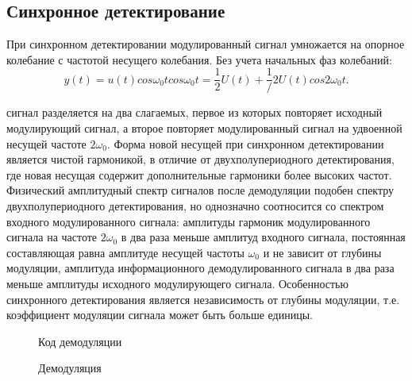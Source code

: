 \documentclass[12pt,a4paper]{scrartcl}
\begin{document}
\clearpage
\newpage

\subsection{Синхронное детектирование}
\label{sec:syn_demod}

При синхронном детектировании модулированный сигнал умножается на опорное колебание с частотой несущего колебания. Без учета начальных фаз колебаний: $$y(t)=u(t)cos \omega_0 t cos \omega_0 t = \frac{1}{2}U(t)+\frac{1}/{2} U(t) cos 2 \omega_0 t.$$

сигнал разделяется на два слагаемых, первое из которых повторяет исходный модулирующий сигнал, а второе повторяет модулированный сигнал на удвоенной несущей частоте $2 \omega_0$. Форма новой несущей при синхронном детектировании является чистой гармоникой, в отличие от двухполупериодного детектирования, где новая несущая содержит дополнительные гармоники более высоких частот. Физический амплитудный спектр сигналов после демодуляции подобен спектру двухполупериодного детектирования, но однозначно соотносится со спектром входного модулированного сигнала: амплитуды гармоник модулированного сигнала на частоте $2 \omega_0$ в два раза меньше амплитуд входного сигнала, постоянная составляющая равна амплитуде несущей частоты $\omega_0$ и не зависит от глубины модуляции, амплитуда информационного демодулированного сигнала в два раза меньше амплитуды исходного модулирующего сигнала. Особенностью синхронного детектирования является независимость от глубины модуляции, т.е. коэффициент модуляции сигнала может быть больше единицы.

\begin{figure}[h!]
\caption{Код демодуляции}
\end{figure}

\begin{figure}[h!]
\caption{Демодуляция}
\end{figure}
\end{document}
